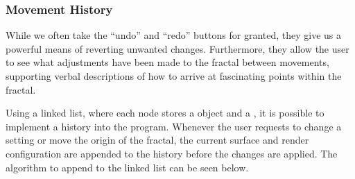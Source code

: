 \subsubsection{Movement History}

While we often take the ``undo'' and ``redo'' buttons for granted, they give us a powerful means of reverting unwanted changes. Furthermore, they allow the user to see what adjustments have been made to the fractal between movements, supporting verbal descriptions of how to arrive at fascinating points within the fractal.

Using a linked list, where each node stores a  object and a , it is possible to implement a history into the program. Whenever the user requests to change a setting or move the origin of the fractal, the current surface and render configuration are appended to the history before the changes are applied. The algorithm to append to the linked list can be seen below.

